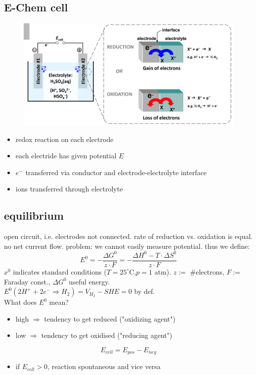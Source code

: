 \documentclass[a4paper,10pt,landscape]{scrartcl}
\begin{document}
\begin{multicols*}{3}
\section{E-Chem cell}
\begin{figure}[H]
    \centering
    \includegraphics[width=1\linewidth]{src/e_cell_redox.png}
    \label{fig:e_cell_redox}
\end{figure}
\vspace{-1cm}
\begin{itemize}
    \item redox reaction on each electrode
    \item each electride has given potential $E$
    \item $e^-$ transferred via conductor and electrode-electrolyte interface
    \item ions transferred through electrolyte
\end{itemize}
\subsection{equilibrium}
open circuit, i.e. electrodes not connected. rate of reduction vs. oxidation is equal. no net current flow. problem: we cannot easily measure potential. thus we define: \\
$$ E^0=-\frac{\Delta G^0}{z \cdot F}=-\frac{\Delta H^0-T \cdot \Delta S^0}{z \cdot F}$$
$x^0$ indicates standard conditions ($T=25^\circ$C,$p=1$ atm). $z :=$ \#electrons, $F:=$ Faraday const., $\Delta G^0$ useful energy. \\
$E^0(2H^+ +2e^-\Rightarrow H_2)=V_{H_2}-SHE=0$ by def. \\
What does $E^0$ mean? \\
\vspace{-.5cm}
\begin{itemize}
    \item high $\Rightarrow$ tendency to get reduced ("oxidizing agent")
    \item low $\Rightarrow$ tendency to get oxidised ("reducing agent")
\end{itemize}
\vspace{.2cm}
$$E_{cell}=E_{pos}-E_{neg}$$
\begin{itemize}
    \item if $E_{cell}>0$, reaction spontaneous and vice versa
\end{itemize}


\end{multicols*}
\end{document}
